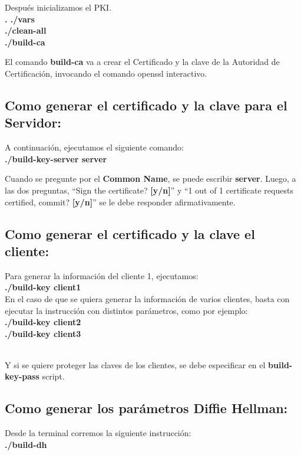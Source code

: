 \documentclass[a4paper, 12pt, usenames]{article}
\newcommand\tab[1][1cm]{\hspace*{#1}}
\begin{document}
Después inicializamos el PKI.\\
\textbf{
    \tab . ./vars\\
    \tab ./clean-all\\
    \tab ./build-ca\\
}

El comando \textbf{build-ca} va a crear el Certificado y la clave de la Autoridad de Certificación, invocando el comando openssl interactivo.\\

\subsection{Como generar el certificado y la clave para el Servidor:}
A continuación, ejecutamos el siguiente comando:\\
\tab \textbf{./build-key-server server\\}

Cuando se pregunte por el \textbf{Common Name}, se puede escribir \textbf{server}. Luego, a las dos preguntas, “Sign the certificate? \textbf{[y/n]}” y “1 out of 1 certificate requests certified, commit? \textbf{[y/n]}” se le debe responder afirmativamente.\\

\subsection{Como generar el certificado y la clave el cliente:}
Para generar la información del cliente 1, ejecutamos:\\
    \tab \textbf{./build-key client1\\}
En el caso de que se quiera generar la información de varios clientes, basta con ejecutar la instrucción con distintos parámetros, como por ejemplo:\\
    \textbf{
    \tab ./build-key client2\\
    \tab ./build-key client3\\ \\ }

Y si se quiere proteger las claves de los clientes, se debe especificar en el \textbf{build-key-pass} script.

\subsection{Como generar los parámetros Diffie Hellman:}

Desde la terminal corremos la siguiente instrucción:\\
    \textbf{\tab ./build-dh\\ \\}
\end{document}
